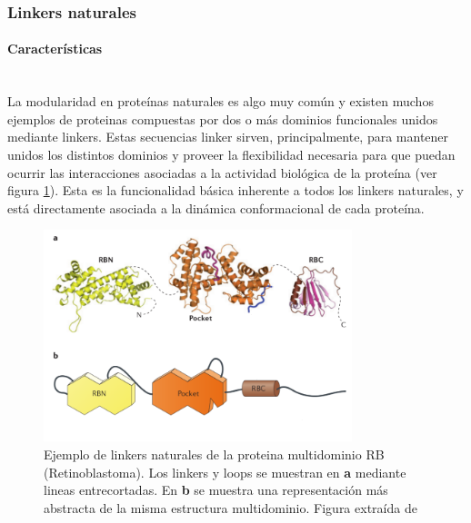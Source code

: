 
\subsubsection{Linkers naturales}


\paragraph{Características} \hspace{0pt} \\ \indent 
La modularidad en proteínas naturales es algo muy común y existen muchos ejemplos de proteinas compuestas por dos o más dominios funcionales unidos mediante linkers.
Estas secuencias linker sirven, principalmente, para mantener unidos los distintos dominios y proveer la flexibilidad necesaria para que puedan ocurrir las interacciones asociadas a la actividad biológica de la proteína
(ver figura \ref{multidomainRb}). Esta es la funcionalidad básica inherente a todos los linkers naturales, y está directamente asociada a la dinámica conformacional de cada proteína. 


\begin{figure}[ht]
\centering
\includegraphics[width=0.8\textwidth]{img/multidomainRb.png} 
\caption{Ejemplo de linkers naturales de la proteina multidominio RB (Retinoblastoma). Los linkers y loops se muestran en \textbf{a} mediante lineas entrecortadas. 
En \textbf{b} se muestra una representación más abstracta de la misma estructura multidominio. Figura extraída de \cite{dick2013molecular}} 
\label{multidomainRb}
\end{figure}


